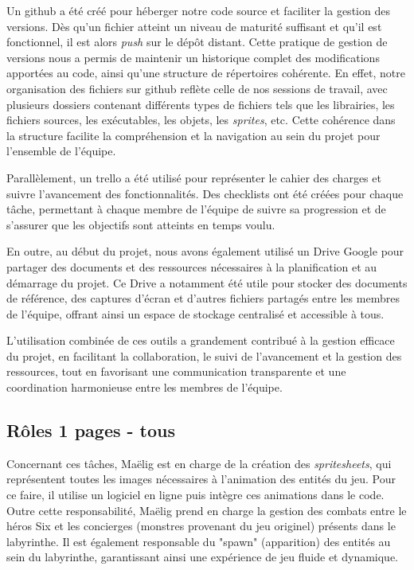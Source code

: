 \documentclass[10pt]{article}
\begin{document}
Un \gls{github} a été créé pour héberger notre code source et faciliter la gestion des versions. Dès qu'un fichier atteint un niveau de maturité suffisant et qu'il est fonctionnel, il est alors \textit{\gls{push}} sur le dépôt distant. Cette pratique de gestion de versions nous a permis de maintenir un historique complet des modifications apportées au code, ainsi qu'une structure de répertoires cohérente. En effet, notre organisation des fichiers sur \gls{github} reflète celle de nos sessions de travail, avec plusieurs dossiers contenant différents types de fichiers tels que les librairies, les fichiers sources, les exécutables, les objets, les \textit{\gls{sprites}}, etc. Cette cohérence dans la structure facilite la compréhension et la navigation au sein du projet pour l'ensemble de l'équipe.

Parallèlement, un \gls{trello} a été utilisé pour représenter le cahier des charges et suivre l'avancement des fonctionnalités. Des checklists ont été créées pour chaque tâche, permettant à chaque membre de l'équipe de suivre sa progression et de s'assurer que les objectifs sont atteints en temps voulu.

En outre, au début du projet, nous avons également utilisé un Drive Google pour partager des documents et des ressources nécessaires à la planification et au démarrage du projet. Ce Drive a notamment été utile pour stocker des documents de référence, des captures d'écran et d'autres fichiers partagés entre les membres de l'équipe, offrant ainsi un espace de stockage centralisé et accessible à tous.

L'utilisation combinée de ces outils a grandement contribué à la gestion efficace du projet, en facilitant la collaboration, le suivi de l'avancement et la gestion des ressources, tout en favorisant une communication transparente et une coordination harmonieuse entre les membres de l'équipe.


\subsection{Rôles 1 pages - tous}
Concernant ces tâches, Maëlig est en charge de la création des \textit{\gls{spritesheets}}, qui représentent toutes les images nécessaires à l'animation des entités du jeu. Pour ce faire, il utilise un logiciel en ligne puis intègre ces animations dans le code. Outre cette responsabilité, Maëlig prend en charge la gestion des combats entre le héros Six et les concierges (monstres provenant du jeu originel) présents dans le labyrinthe. Il est également responsable du "spawn" (apparition) des entités au sein du labyrinthe, garantissant ainsi une expérience de jeu fluide et dynamique.
\end{document}
